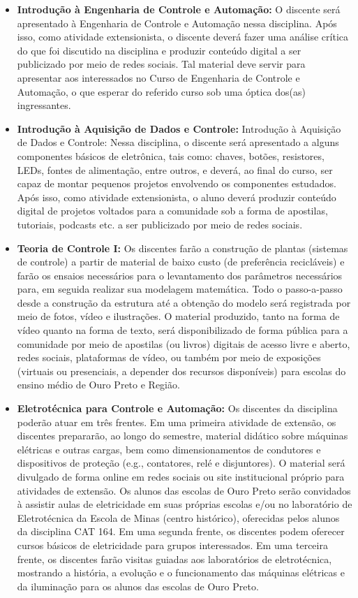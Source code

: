 \documentclass[
	12pt,				%
	openright,			%
	oneside,			%
	a4paper,			%
	english,			%
	brazil				%
	]{abntex2}
\begin{document}
\begin{itemize}
    \item \textbf{Introdução à Engenharia de Controle e Automação:} O discente  será apresentado à Engenharia de Controle e Automação nessa disciplina. Após isso, como atividade extensionista, o discente deverá fazer uma análise crítica do que foi discutido na disciplina e produzir conteúdo digital a ser publicizado por meio de redes sociais. Tal material deve servir para apresentar aos interessados no Curso de Engenharia de Controle e Automação, o que esperar do referido curso sob uma óptica dos(as) ingressantes.

    \item \textbf{Introdução à Aquisição de Dados e Controle:} Introdução à Aquisição de Dados e Controle: Nessa disciplina, o discente será apresentado a alguns componentes básicos de eletrônica, tais como: chaves, botões, resistores, LEDs, fontes de alimentação, entre outros, e deverá, ao final do curso, ser capaz de montar pequenos projetos envolvendo os componentes estudados. Após isso, como atividade extensionista, o aluno deverá produzir conteúdo digital de projetos voltados para a comunidade sob a forma de apostilas, tutoriais, podcasts etc. a ser publicizado por meio de redes sociais.

    \item \textbf{Teoria de Controle I:} Os discentes farão a construção de plantas (sistemas de controle) a partir de material de baixo custo (de preferência recicláveis) e farão os ensaios necessários para o levantamento dos parâmetros necessários para, em seguida realizar sua modelagem matemática. Todo o passo-a-passo desde a construção da estrutura até a obtenção do modelo será registrada por meio de fotos, vídeo e ilustrações. O material produzido, tanto na forma de vídeo quanto na forma de texto, será disponibilizado de forma pública para a comunidade por meio de apostilas (ou livros) digitais de acesso livre e aberto, redes sociais, plataformas de vídeo, ou também por meio de exposições (virtuais ou presenciais, a depender dos recursos disponíveis) para escolas do ensino médio de Ouro Preto e Região.

    \item \textbf{Eletrotécnica para Controle e Automação:} Os discentes da disciplina poderão atuar em três frentes. Em uma primeira atividade de extensão, os discentes prepararão, ao longo do semestre, material didático sobre máquinas elétricas e outras cargas, bem como dimensionamentos de condutores e dispositivos de proteção (e.g., contatores, relé e disjuntores). O material será divulgado de forma online em redes sociais ou site institucional próprio para atividades de extensão. Os alunos das escolas de Ouro Preto serão convidados à assistir aulas de eletricidade em suas próprias escolas e/ou no laboratório de Eletrotécnica da Escola de Minas (centro histórico), oferecidas pelos alunos da disciplina CAT 164. Em uma segunda frente, os discentes podem oferecer cursos básicos de eletricidade para grupos interessados. Em uma terceira frente, os discentes farão visitas guiadas aos laboratórios de eletrotécnica, mostrando a história, a evolução e o funcionamento das máquinas elétricas e da iluminação para os alunos das escolas de Ouro Preto.


\end{itemize}
\end{document}
